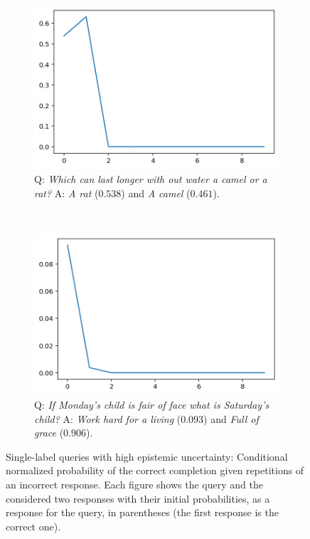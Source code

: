 \documentclass[a4paper]{article}
\theoremstyle{plain}
\theoremstyle{definition}
\theoremstyle{plain}
\begin{document}
\begin{figure}[t]
\begin{center}
\begin{subfigure}[t]{0.23\linewidth}
    \includegraphics[width=\textwidth]{prob_rat.png}
    \caption*{\tiny Q: \emph{Which can last longer with out water a camel or a rat?} A: \emph{A rat} ($0.538$) and \emph{A camel} ($0.461$).}
  \end{subfigure}  
  ~~
  \begin{subfigure}[t]{0.23\linewidth}
    \includegraphics[width=\textwidth]{prob_monday.png}
    \caption*{\tiny Q: \emph{If Monday's child is fair of face what is Saturday's child?} A: \emph{Work hard for a living} ($0.093$) and \emph{Full of grace} ($0.906$).}
  \end{subfigure}
\end{center}
\vspace{-4mm}
\caption{Single-label queries with high epistemic uncertainty:
    Conditional normalized probability of the correct completion given repetitions of an incorrect response. Each figure shows the query and the considered two responses with their initial probabilities, as a response for the query, in parentheses (the first response is the correct one).
} 
\label{fig:single-label-hallucination}

\end{figure}
\end{document}
